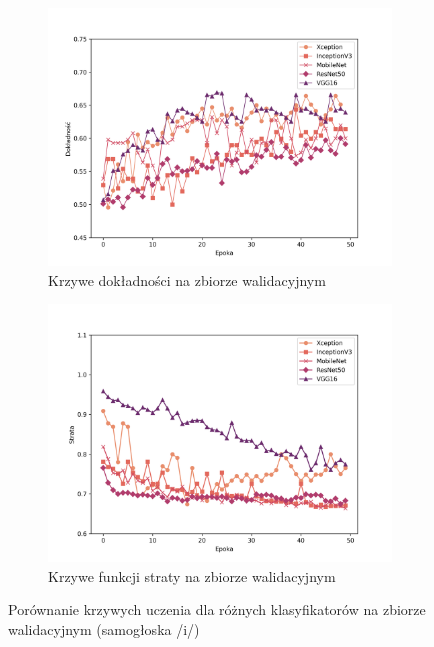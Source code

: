 \begin{figure}[ht]
    \centering
    \begin{subfigure}{0.49\textwidth}
        \centering
        \includegraphics[width=\textwidth]{./img/results/i_acc}
        \caption{Krzywe dokładności na zbiorze walidacyjnym\@}
        \label{fig:i_acc}
    \end{subfigure}
    \begin{subfigure}{0.49\textwidth}
        \centering
        \includegraphics[width=\textwidth]{./img/results/i_loss}
        \caption{Krzywe funkcji straty na zbiorze walidacyjnym\@}
        \label{fig:i_loss}
    \end{subfigure}

    \caption{Porównanie krzywych uczenia dla różnych klasyfikatorów na zbiorze walidacyjnym (samogłoska /i/)}
    \label{fig:i_results}
\end{figure}


